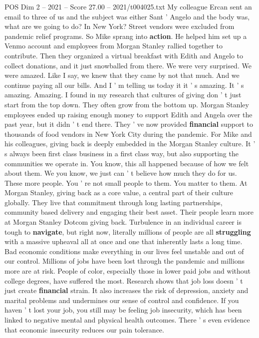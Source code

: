 \begin{textsample}{POS Dim 2 – 2021 – Score 27.00 – 2021/t004025.txt}
My colleague Ercan sent an email to three of us and the subject was either Sant ' Angelo and the body was, what are we going to do?
In New York?
Street vendors were excluded from pandemic relief programs.
So Mike sprang into \textbf{action}.
He helped him set up a Venmo account and employees from Morgan Stanley rallied together to contribute.
Then they organized a virtual breakfast with Edith and Angelo to collect donations, and it just snowballed from there.
We were very surprised.
We were amazed.
Like I say, we knew that they came by not that much.
And we continue paying all our bills.
And I ' m telling us today it it ' s amazing.
It ' s amazing.
Amazing.
I found in my research that cultures of giving don ' t just start from the top down.
They often grow from the bottom up.
Morgan Stanley employees ended up raising enough money to support Edith and Angela over the past year, but it didn ' t end there.
They ' ve now provided \textbf{financial} support to thousands of food vendors in New York City during the pandemic.
For Mike and his colleagues, giving back is deeply embedded in the Morgan Stanley culture.
It ' s always been first class business in a first class way, but also supporting the communities we operate in.
You know, this all happened because of how we felt about them.
We you know, we just can ' t believe how much they do for us.
These more people.
You ' re not small people to them.
You matter to them.
At Morgan Stanley, giving back as a core value, a central part of their culture globally.
They live that commitment through long lasting partnerships, community based delivery and engaging their best asset.
Their people learn more at Morgan Stanley Dotcom giving back.
Turbulence in an individual career is tough to \textbf{navigate}, but right now, literally millions of people are all \textbf{struggling} with a massive upheaval all at once and one that inherently lasts a long time.
Bad economic conditions make everything in our lives feel unstable and out of our control.
Millions of jobs have been lost through the pandemic and millions more are at risk.
People of color, especially those in lower paid jobs and without college degrees, have suffered the most.
Research shows that job loss doesn ' t just create \textbf{financial} strain.
It also increases the risk of depression, anxiety and marital problems and undermines our sense of control and confidence.
If you haven ' t lost your job, you still may be feeling job insecurity, which has been linked to negative mental and physical health outcomes.
There ' s even evidence that economic insecurity reduces our pain tolerance.

\end{textsample}
